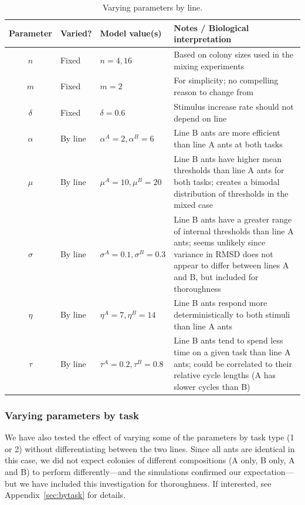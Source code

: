 \documentclass[11pt]{article}
\begin{document}
\begin{table}[H] \small
  \begin{center}
    \begin{tabular}{|c|>{\centering}m{0.6in}|>{\centering}m{1.15in}|m{3.5in}|} 
      \hline
      \textbf{Parameter} & \textbf{Varied?} & \textbf{Model value(s)} & \textbf{Notes / Biological interpretation} \\ \hline
      $n$ & Fixed & $n = 4, 16$ & Based on colony sizes used in the mixing experiments \\ \hline
      $m$ & Fixed & $m = 2$ & For simplicity; no compelling reason to change from \cite{ulrich2018} \\ \hline
      $\delta$ & Fixed & $\delta = 0.6$ & Stimulus increase rate should not depend on line\\ \hline
      $\alpha$ & By line  & $\alpha^A = 2,\alpha^B = 6$ & Line B ants are more efficient than line A ants at both tasks \\ \hline
      $\mu$ & By line  & $\mu^A = 10,\mu^B = 20 $ & Line B ants have higher mean thresholds than line A ants for both tasks; creates a bimodal distribution of thresholds in the mixed case \\ \hline
      $\sigma$ & By line & $\sigma^A = 0.1, \sigma^B = 0.3$ & Line B ants have a greater range of internal thresholds than line A ants; seems unlikely since variance in RMSD does not appear to differ between lines A and B, but included for thoroughness \\ \hline
      $\eta$ & By line & $\eta^A = 7, \eta^B = 14 $ &  Line B ants respond more deterministically to both stimuli than line A ants\\ \hline
      $\tau$ & By line & $\tau^A = 0.2,\tau^B = 0.8 $ & Line B ants tend to spend less time on a given task than line A ants; could be correlated to their relative cycle lengths (A has slower cycles than B) \\ \hline
    \end{tabular}
    \caption{Varying parameters by line.\vspace{-15pt}}
    \label{tab:byline}
  \end{center}
\end{table}

\subsubsection{Varying parameters by task} 
We have also tested the effect of varying some of the parameters by task type (1 or 2) without differentiating between the two lines. 
Since all ants are identical in this case, we did not expect colonies of different compositions (A only, B only, A and B) to perform differently---and the simulations confirmed our expectation---but we have included this investigation for thoroughness.
If interested, see Appendix~\ref{sec:bytask} for details.
\end{document}
